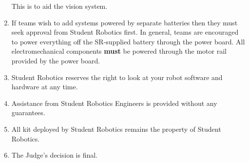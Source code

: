 \begin{enumerate}
 This is to aid the vision system.
\item If teams wish to add systems powered by separate batteries then they must seek approval from Student Robotics first.
 In general, teams are encouraged to power everything off the SR-supplied battery through the power board.
 All electromechanical components \textbf{must} be powered through the motor rail provided by the power board.
\item Student Robotics reserves the right to look at your robot software and hardware at any time.
\item Assistance from Student Robotics Engineers is provided without any guarantees.
\item All kit deployed by Student Robotics remains the property of Student Robotics.
\item The Judge's decision is final.


\end{enumerate}

